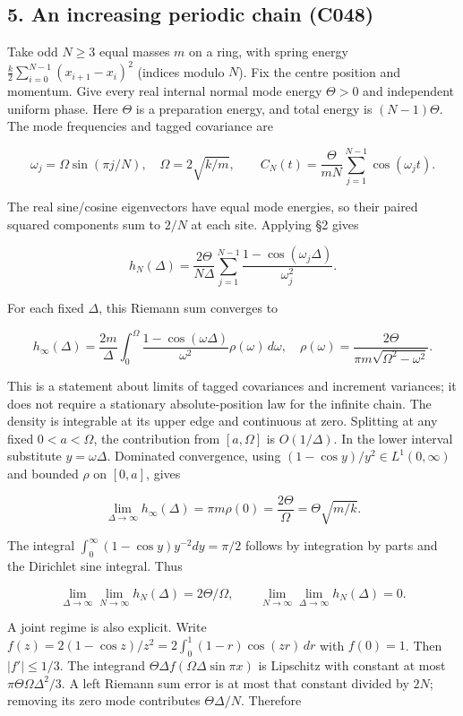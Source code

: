\documentclass[11pt,a4paper]{article}
\begin{document}
\hypertarget{an-increasing-periodic-chain-c048}{%
\subsection{5. An increasing periodic chain
(C048)}\label{an-increasing-periodic-chain-c048}}

Take odd \(N\ge3\) equal masses \(m\) on a ring, with spring energy
\(\frac{k}{2}\sum_{i=0}^{N-1}(x_{i+1}-x_i)^2\) (indices modulo \(N\)).
Fix the centre position and momentum. Give every real internal normal
mode energy \(\Theta>0\) and independent uniform phase. Here \(\Theta\)
is a preparation energy, and total energy is \((N-1)\Theta\). The mode
frequencies and tagged covariance are

\[
\omega_j=\Omega\sin(\pi j/N),\quad \Omega=2\sqrt{k/m},\qquad
C_N(t)=\frac{\Theta}{mN}\sum_{j=1}^{N-1}\cos(\omega_jt).
\]

The real sine/cosine eigenvectors have equal mode energies, so their
paired squared components sum to \(2/N\) at each site. Applying §2 gives

\[
h_N(\Delta)=\frac{2\Theta}{N\Delta}\sum_{j=1}^{N-1}
\frac{1-\cos(\omega_j\Delta)}{\omega_j^2}.
\]

For each fixed \(\Delta\), this Riemann sum converges to

\[
h_\infty(\Delta)=\frac{2m}{\Delta}\int_0^\Omega
\frac{1-\cos(\omega\Delta)}{\omega^2}\rho(\omega)\,d\omega,
\quad \rho(\omega)=\frac{2\Theta}{\pi m\sqrt{\Omega^2-\omega^2}}.
\]

This is a statement about limits of tagged covariances and increment
variances; it does not require a stationary absolute-position law for
the infinite chain. The density is integrable at its upper edge and
continuous at zero. Splitting at any fixed \(0<a<\Omega\), the
contribution from \([a,\Omega]\) is \(O(1/\Delta)\). In the lower
interval substitute \(y=\omega\Delta\). Dominated convergence, using
\((1-\cos y)/y^2\in L^1(0,\infty)\) and bounded \(\rho\) on \([0,a]\),
gives

\[
\lim_{\Delta\to\infty}h_\infty(\Delta)
=\pi m\rho(0)=\frac{2\Theta}{\Omega}=\Theta\sqrt{m/k}.
\]

The integral \(\int_0^\infty(1-\cos y)y^{-2}dy=\pi/2\) follows by
integration by parts and the Dirichlet sine integral. Thus

\[
\lim_{\Delta\to\infty}\lim_{N\to\infty}h_N(\Delta)=2\Theta/\Omega,
\qquad
\lim_{N\to\infty}\lim_{\Delta\to\infty}h_N(\Delta)=0.
\]

A joint regime is also explicit. Write
\(f(z)=2(1-\cos z)/z^2=2\int_0^1(1-r)\cos(zr)\,dr\) with \(f(0)=1\).
Then \(|f'|\le1/3\). The integrand
\(\Theta\Delta f(\Omega\Delta\sin\pi x)\) is Lipschitz with constant at
most \(\pi\Theta\Omega\Delta^2/3\). A left Riemann sum error is at most
that constant divided by \(2N\); removing its zero mode contributes
\(\Theta\Delta/N\). Therefore
\end{document}
